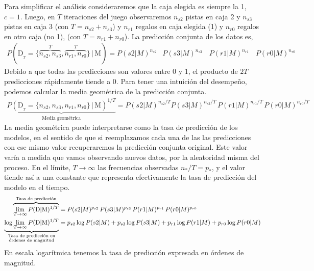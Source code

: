 \documentclass[a4paper,11pt]{book}
\newcommand\hfrac[2]{\genfrac{}{}{0pt}{}{#1}{#2}} %
\theoremstyle{definition}
\begin{document}
Para simplificar el an\'alisis consideraremos que la caja elegida es siempre la 1, $c=1$.
%
Luego, en $T$ iteraciones del juego observaremos $n_{s2}$ pistas en caja 2 y $n_{s3}$ pistas en caja 3 (con $T=n_{s2} + n_{s3}$) y $n_{r1}$ regalos en caja elegida (1) y $n_{r0}$ regalos en otro caja (no 1), (con $T=n_{r1} + n_{r0}$).
%
La predicci\'on conjunta de los datos es,
\begin{align*}
P(\text{D}_{_T} = \{\overbrace{n_{s2}, n_{s3}}^{T}, \overbrace{n_{r1}, n_{r0}}^{T} \} \, | \, \text{M}) = P(s2|M)^{n_{s2}\phantom{/T}}  P(s3|M)^{n_{s3}\phantom{/T}} \, P(r1|M)^{n_{r1}\phantom{/T}} \, P(r0|M)^{n_{r0}\phantom{/T}}
\end{align*}
%
Debido a que todas las predicciones son valores entre 0 y 1, el producto de $2T$ predicciones r\'apidamente tiende a 0.
%
Para tener una intuici\'on del desempe\~no, podemos calcular la media geom\'etrica de la predicci\'on conjunta.
%
\begin{align*}
\underbrace{P(\text{D}_{_T} = \{n_{s2}, n_{s3}, n_{r1}, n_{r0}\} \, | \, \text{M})^{1/T}}_{\text{Media geom\'etrica}} = P(s2|M)^{n_{s2}/T}  P(s3|M)^{n_{s3}/T} \, P(r1|M)^{n_{r1}/T} \, P(r0|M)^{n_{r0}/T}
\end{align*}
%
La media geom\'etrica puede interpretarse como la tasa de predicci\'on de los modelos, en el sentido de que si reemplazamos cada una de las las predicciones con ese mismo valor recuperaremos la predicci\'on conjunta original.
%
Este valor var\'ia a medida que vamos observando nuevos datos, por la aleatoridad misma del proceso.
%
En el l\'imite, $T\rightarrow\infty$ las frecuencias observadas $n_{*}/T = p_*$, y el valor tiende as\'i a una constante que representa efectivamente la tasa de predicci\'on del modelo en el tiempo.
%
\begin{align*}
\overbrace{\lim_{T \rightarrow \infty} P(\text{D}|\text{M})^{1/T}}^{\text{Tasa de predicci\'on}} &= P(s2|M)^{p_{s2}} \, P(s3|M)^{p_{s3}} \, P(r1|M)^{p_{r1}} \, P(r0|M)^{p_{r0}} \\
\underbrace{\log \lim_{T \rightarrow \infty} P(\text{D}|\text{M})^{1/T}}_{\hfrac{\text{\scriptsize Tasa de predicci\'on en}}{\text{\scriptsize \'ordenes de magnitud}}} &= p_{s2} \log P(s2|M) + p_{s3} \log P(s3|M) + p_{r1} \log P(r1|M) + p_{r0} \log P(r0|M)
\end{align*}
%
En escala logar\'itmica tenemos la tasa de predicci\'on expresada en \'ordenes de magnitud.

\end{document}
